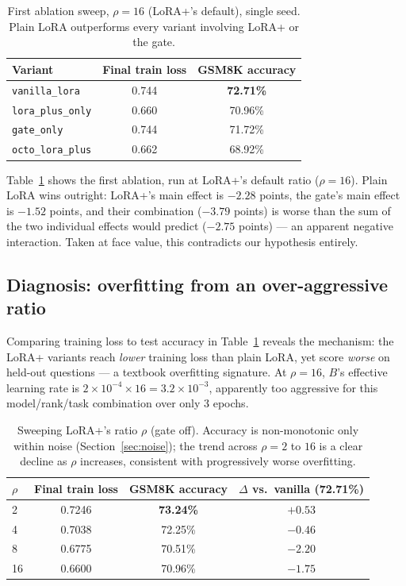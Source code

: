 \documentclass[11pt]{article}
\begin{document}
\begin{table}[t]
\centering
\caption{First ablation sweep, $\rho=16$ (LoRA+'s default), single seed.
Plain LoRA outperforms every variant involving LoRA+ or the gate.}
\label{tab:initial}
\begin{tabular}{lcc}
\toprule
Variant & Final train loss & GSM8K accuracy \\
\midrule
\texttt{vanilla\_lora}     & 0.744 & \textbf{72.71\%} \\
\texttt{lora\_plus\_only}  & 0.660 & 70.96\% \\
\texttt{gate\_only}        & 0.744 & 71.72\% \\
\texttt{octo\_lora\_plus}  & 0.662 & 68.92\% \\
\bottomrule
\end{tabular}
\end{table}

Table~\ref{tab:initial} shows the first ablation, run at LoRA+'s default
ratio ($\rho=16$). Plain LoRA wins outright: LoRA+'s main effect is
$-2.28$ points, the gate's main effect is $-1.52$ points, and their
combination ($-3.79$ points) is worse than the sum of the two individual
effects would predict ($-2.75$ points) — an apparent negative interaction.
Taken at face value, this contradicts our hypothesis entirely.

\subsection{Diagnosis: overfitting from an over-aggressive ratio}

Comparing training loss to test accuracy in Table~\ref{tab:initial}
reveals the mechanism: the LoRA+ variants reach \emph{lower} training loss
than plain LoRA, yet score \emph{worse} on held-out questions — a
textbook overfitting signature. At $\rho=16$, $B$'s effective learning
rate is $2\times10^{-4} \times 16 = 3.2\times10^{-3}$, apparently too
aggressive for this model/rank/task combination over only 3 epochs.

\begin{table}[t]
\centering
\caption{Sweeping LoRA+'s ratio $\rho$ (gate off). Accuracy is
non-monotonic only within noise (Section~\ref{sec:noise}); the trend
across $\rho=2$ to $16$ is a clear decline as $\rho$ increases, consistent
with progressively worse overfitting.}
\label{tab:ratiosweep}
\begin{tabular}{lccc}
\toprule
$\rho$ & Final train loss & GSM8K accuracy & $\Delta$ vs.\ vanilla (72.71\%) \\
\midrule
2  & 0.7246 & \textbf{73.24\%} & $+0.53$ \\
4  & 0.7038 & 72.25\% & $-0.46$ \\
8  & 0.6775 & 70.51\% & $-2.20$ \\
16 & 0.6600 & 70.96\% & $-1.75$ \\
\bottomrule
\end{tabular}
\end{table}
\end{document}

